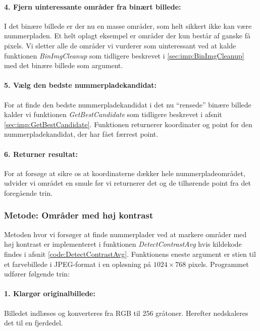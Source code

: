 \paragraph{4. Fjern uinteressante områder fra binært billede:}
I det binære billede er der nu en masse områder, som helt sikkert ikke kan være nummerpladen. Et helt oplagt eksempel er områder der kun består af ganske få pixels. Vi sletter alle de områder vi vurderer som uinteressant ved at kalde funktionen \textit{BinImgCleanup} som tidligere beskrevet i \vref{sec:imp:BinImgCleanup} med det binære billede som argument.

\paragraph{5. Vælg den bedste nummerpladekandidat:}
For at finde den bedste nummerpladekandidat i det nu ``rensede'' binære billede kalder vi funktionen \textit{GetBestCandidate} som tidligere beskrevet i afsnit \vref{sec:imp:GetBestCandidate}. Funktionen returnerer koordinater og point for den nummerpladekandidat, der har fået færrest point. 

\paragraph{6. Returner resultat:}
For at forsøge at sikre os at koordinaterne dækker hele nummerpladeområdet, udvider vi området en smule før vi returnerer det og de tilhørende point fra det foregående trin. 


\subsubsection{Metode: Områder med høj kontrast}
Metoden hvor vi forsøger at finde nummerplader ved at markere områder med høj kontrast er implementeret i funktionen \textit{DetectContrastAvg} hvis kildekode findes i afsnit \vref{code:DetectContrastAvg}. Funktionens eneste argument er stien til et farvebillede i JPEG-format i en opløsning på $1024 \times 768$ pixels. Programmet udfører følgende trin:

\paragraph{1. Klargør originalbillede:}
Billedet indlæses og konverteres fra RGB til 256 gråtoner. Herefter nedskaleres det til en fjerdedel.

